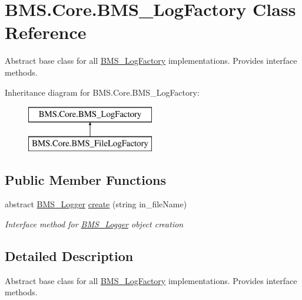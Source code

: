 \hypertarget{class_b_m_s_1_1_core_1_1_b_m_s___log_factory}{\section{B\-M\-S.\-Core.\-B\-M\-S\-\_\-\-Log\-Factory Class Reference}
\label{class_b_m_s_1_1_core_1_1_b_m_s___log_factory}
}


Abstract base class for all \hyperlink{class_b_m_s_1_1_core_1_1_b_m_s___log_factory}{B\-M\-S\-\_\-\-Log\-Factory} implementations. Provides interface methods.  


Inheritance diagram for B\-M\-S.\-Core.\-B\-M\-S\-\_\-\-Log\-Factory\-:\begin{figure}[H]
\begin{center}
\leavevmode
\includegraphics[height=2.000000cm]{class_b_m_s_1_1_core_1_1_b_m_s___log_factory}
\end{center}
\end{figure}
\subsection*{Public Member Functions}
\begin{DoxyCompactItemize}
\item 
abstract \hyperlink{class_b_m_s_1_1_core_1_1_b_m_s___logger}{B\-M\-S\-\_\-\-Logger} \hyperlink{class_b_m_s_1_1_core_1_1_b_m_s___log_factory_aae44a65a49e0f08985f692d180c0931d}{create} (string in\-\_\-file\-Name)
\begin{DoxyCompactList}\small\item\em Interface method for \hyperlink{class_b_m_s_1_1_core_1_1_b_m_s___logger}{B\-M\-S\-\_\-\-Logger} object creation \end{DoxyCompactList}\end{DoxyCompactItemize}


\subsection{Detailed Description}
Abstract base class for all \hyperlink{class_b_m_s_1_1_core_1_1_b_m_s___log_factory}{B\-M\-S\-\_\-\-Log\-Factory} implementations. Provides interface methods. 



